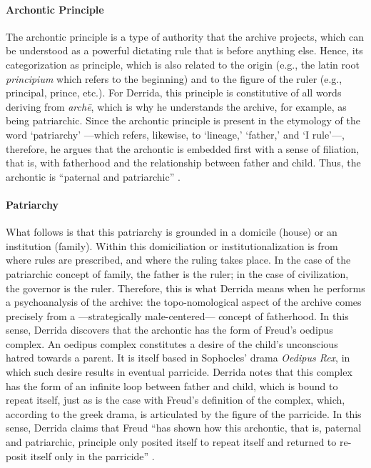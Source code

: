 {	\paragraph{Archontic Principle}
	The archontic principle is a type of authority that the archive projects, which can be understood as a powerful dictating rule that is before anything else. Hence, its categorization as principle, which is also related to the origin (e.g., the latin root \textit{principium} which refers to the beginning) and to the figure of the ruler (e.g., principal, prince, etc.). For Derrida, this principle is constitutive of all words deriving from \textit{archē}, which is why he understands the archive, for example, as being patriarchic. Since the archontic principle is present in the etymology of the word `patriarchy' ---which refers, likewise, to `lineage,' `father,' and `I rule'---, therefore, he argues that the archontic is embedded first with a sense of filiation, that is, with fatherhood and the relationship between father and child. Thus, the archontic is ``paternal and patriarchic'' \parencite[60]{Der95:Arc}. 



	\paragraph{Patriarchy}
	What follows is that this patriarchy is grounded in a domicile (house) or an institution (family). Within this domiciliation or institutionalization is from where rules are prescribed, and where the ruling takes place. In the case of the patriarchic concept of family, the father is the ruler; in the case of civilization, the governor is the ruler. Therefore, this is what Derrida means when he performs a psychoanalysis of the archive: the topo-nomological aspect of the archive comes precisely from a ---strategically male-centered--- concept of fatherhood. In this sense, Derrida discovers that the archontic has the form of Freud's oedipus complex. An oedipus complex constitutes a desire of the child's unconscious hatred towards a parent. It is itself based in Sophocles' drama \textit{Oedipus Rex}, in which such desire results in eventual parricide. Derrida notes that this complex has the form of an infinite loop between father and child, which is bound to repeat itself, just as is the case with Freud's definition of the complex, which, according to the greek drama, is articulated by the figure of the parricide. In this sense, Derrida claims that Freud ``has shown how this archontic, that is, paternal and patriarchic, principle only posited itself to repeat itself and returned to re-posit itself only in the parricide'' \parencite[60]{Der95:Arc}.

}
